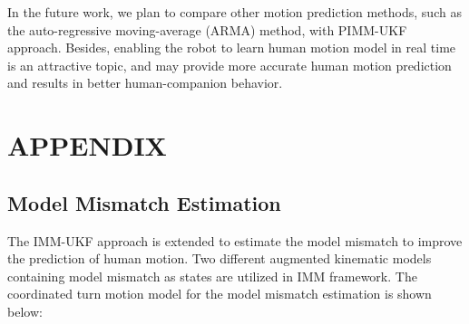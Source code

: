\documentclass[journal]{IEEEtran}
\begin{document}
	In the future work, we plan to compare other motion prediction methods, such as the auto-regressive moving-average (ARMA) method, with PIMM-UKF approach.
	Besides, enabling the robot to learn human motion model in real time is an attractive topic, and may provide more accurate human motion prediction and results in better human-companion behavior.
	
	\section*{APPENDIX}
	\subsection{Model Mismatch Estimation}
    The IMM-UKF approach is extended to estimate the model mismatch to improve the prediction of human motion. Two different augmented kinematic models containing model mismatch as states are utilized in IMM framework. The coordinated turn motion model for the model mismatch estimation is shown below:
\end{document}
